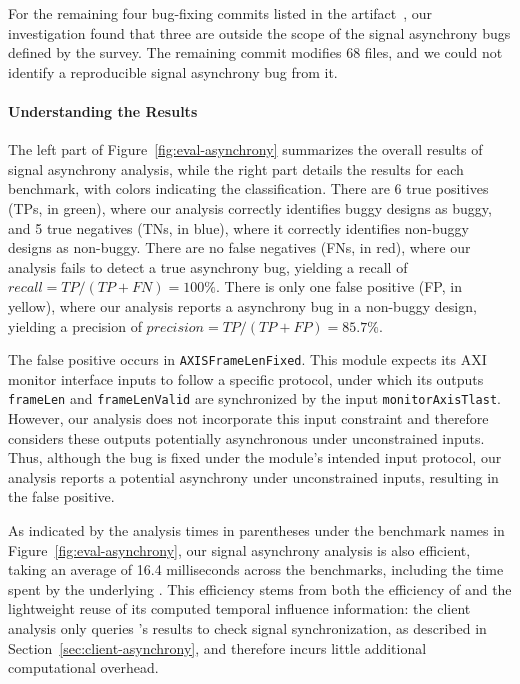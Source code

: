 For the remaining four bug-fixing commits listed in the artifact~\cite{ma_debugging_2022_artifact}, our investigation found that three are outside the scope of the signal asynchrony bugs defined by the survey.
The remaining commit modifies 68 files, and we could not identify a reproducible signal asynchrony bug from it.

\paragraph{Understanding the Results}
The left part of Figure~\ref{fig:eval-asynchrony} summarizes the overall results of signal asynchrony analysis, while the right part details the results for each benchmark, with colors indicating the classification.
There are 6 true positives (TPs, in green), where our analysis correctly identifies buggy designs as buggy, and 5 true negatives (TNs, in blue), where it correctly identifies non-buggy designs as non-buggy.
There are no false negatives (FNs, in red), where our analysis fails to detect a true asynchrony bug, yielding a recall of $\mathit{recall} = \mathit{TP}/(\mathit{TP}+\mathit{FN}) = 100\%$.
There is only one false positive (FP, in yellow), where our analysis reports a asynchrony bug in a non-buggy design, yielding a precision of $\mathit{precision} = \mathit{TP}/(\mathit{TP}+\mathit{FP}) = 85.7\%$.

The false positive occurs in \texttt{AXISFrameLenFixed}.
This module expects its AXI monitor interface inputs to follow a specific protocol, under which its outputs \texttt{frameLen} and \texttt{frameLenValid} are synchronized by the input \texttt{monitorAxisTlast}.
However, our analysis does not incorporate this input constraint and therefore considers these outputs potentially asynchronous under unconstrained inputs.
Thus, although the bug is fixed under the module's intended input protocol, our analysis reports a potential asynchrony under unconstrained inputs, resulting in the false positive.

As indicated by the analysis times in parentheses under the benchmark names in Figure~\ref{fig:eval-asynchrony}, our signal asynchrony analysis is also efficient, taking an average of 16.4 milliseconds across the benchmarks, including the time spent by the underlying \tia.
This efficiency stems from both the efficiency of \tia and the lightweight reuse of its computed temporal influence information: the client analysis only queries \tia's results to check signal synchronization, as described in Section~\ref{sec:client-asynchrony}, and therefore incurs little additional computational overhead.
